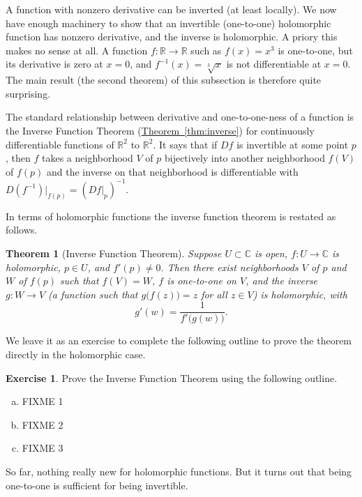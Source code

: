 \documentclass[12pt,openany]{book}
\newcommand{\C}{{\mathbb{C}}}
\newcommand{\R}{{\mathbb{R}}}
\theoremstyle{plain}
\newtheorem{thm}{Theorem}[section]
\theoremstyle{remark}
\theoremstyle{definition}
\newenvironment{exbox}{%
    \def\FrameCommand{\vrule width 1pt \relax\hspace {10pt}}%
    \MakeFramed {\advance \hsize -\width \FrameRestore }%
}{%
    \endMakeFramed
}
\newenvironment{exparts}{%
    \leavevmode\begin{enumerate}[a),noitemsep,topsep=0pt,parsep=0pt,partopsep=0pt]
}{%
    \end{enumerate}
}
\theoremstyle{exercise}
\newtheorem{exercise}{Exercise}[section]
\theoremstyle{example}
\newcommand{\thmref}[1]{\hyperref[#1]{Theorem~\ref*{#1}}}
\begin{document}
A function with nonzero derivative can be inverted (at least locally).
We now have enough machinery to show that an invertible (one-to-one)
holomorphic function has nonzero derivative, and the inverse is holomorphic.
A priory this makes no
sense at all.  A function $f \colon \R \to \R$ such as $f(x) = x^3$
is one-to-one, but its derivative is zero at $x=0$, and $f^{-1}(x) =
\sqrt[3]{x}$ is not differentiable at $x=0$.  The main result (the second
theorem) of this subsection
is therefore quite surprising.

The standard relationship between derivative and one-to-one-ness of a
function is the Inverse Function Theorem (\thmref{thm:inverse})
for continuously differentiable
functions of $\R^2$ to $\R^2$.
It says that if $Df$ is invertible at some point $p$, then $f$ takes a
neighborhood $V$ of $p$ bijectively into another neighborhood $f(V)$
of $f(p)$ and the inverse on that neighborhood is differentiable with
$D(f^{-1})|_{f(p)} = (Df|_p)^{-1}$.

In terms of holomorphic functions the inverse function theorem is restated
as follows.

\begin{thm}[Inverse Function Theorem] 
Suppose $U \subset \C$ is open, $f \colon U \to \C$ is holomorphic,
$p \in U$, and $f'(p) \not= 0$.  Then there exist neighborhoods $V$ of $p$
and $W$ of $f(p)$ such that $f(V) = W$, $f$ is one-to-one on $V$, and
the inverse $g \colon W \to V$ (a function such that $g\bigl(f(z)\bigr)=z$
for all $z \in V$) is holomorphic, with
\begin{equation*}
g'(w) = \frac{1}{f'\bigl(g(w)\bigr)} .
\end{equation*}
\end{thm}

We leave it as an exercise to complete the following outline
to prove the theorem directly in the holomorphic case.

\begin{exbox}
\begin{exercise}
Prove the Inverse Function Theorem using the following outline.
\begin{exparts}
\item FIXME 1
\item FIXME 2
\item FIXME 3
\end{exparts}
\end{exercise}
\end{exbox}

So far, nothing really new for holomorphic functions.  But it turns out that
being one-to-one is sufficient for being invertible.
\end{document}

